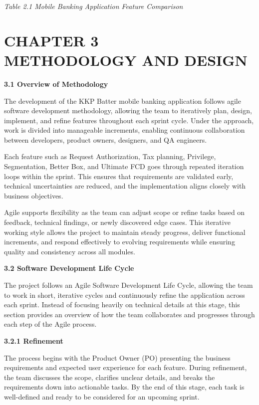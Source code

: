 \emph{Table 2.1 Mobile Banking Application Feature Comparison}

\section{\texorpdfstring{\hfill\break
}{ }}\label{section-41}

\section{\texorpdfstring{\textbf{CHAPTER 3\\
}METHODOLOGY AND
DESIGN}{CHAPTER 3 METHODOLOGY AND DESIGN}}\label{chapter-3-methodology-and-design}

\textbf{3.1 Overview of Methodology}

The development of the KKP Batter mobile banking application follows
agile software development methodology, allowing the team to iteratively
plan, design, implement, and refine features throughout each sprint
cycle. Under the approach, work is divided into manageable increments,
enabling continuous collaboration between developers, product owners,
designers, and QA engineers.

Each feature such as Request Authorization, Tax planning, Privilege,
Segmentation, Better Box, and Ultimate FCD goes through repeated
iteration loops within the sprint. This ensures that requirements are
validated early, technical uncertainties are reduced, and the
implementation aligns closely with business objectives.

Agile supports flexibility as the team can adjust scope or refine tasks
based on feedback, technical findings, or newly discovered edge cases.
This iterative working style allows the project to maintain steady
progress, deliver functional increments, and respond effectively to
evolving requirements while ensuring quality and consistency across all
modules.

\textbf{3.2 Software Development Life Cycle}

The project follows an Agile Software Development Life Cycle, allowing
the team to work in short, iterative cycles and continuously refine the
application across each sprint. Instead of focusing heavily on technical
details at this stage, this section provides an overview of how the team
collaborates and progresses through each step of the Agile process.

\textbf{3.2.1 Refinement}

The process begins with the Product Owner (PO) presenting the business
requirements and expected user experience for each feature. During
refinement, the team discusses the scope, clarifies unclear details, and
breaks the requirements down into actionable tasks. By the end of this
stage, each task is well-defined and ready to be considered for an
upcoming sprint.

